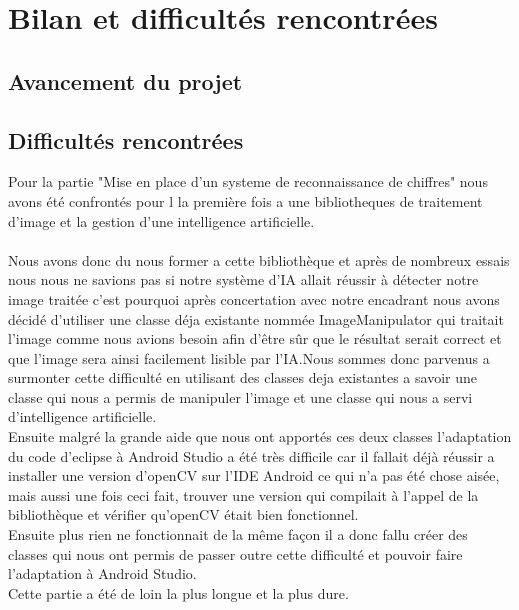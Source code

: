 \documentclass{article}
\begin{document}
\section{Bilan et difficultés rencontrées}

\subsection{Avancement du projet}





\subsection{Difficultés rencontrées}
Pour la partie "Mise en place d'un systeme de reconnaissance de chiffres" nous avons été confrontés pour l la première fois a une bibliotheques de traitement d'image et la gestion d'une intelligence artificielle.\\\\
Nous avons donc du nous former a cette bibliothèque et après de nombreux essais nous nous ne savions pas si notre système d'IA allait réussir à détecter notre image traitée c'est pourquoi après concertation avec notre encadrant nous avons décidé d'utiliser une classe déja existante nommée ImageManipulator qui traitait l'image comme nous avions besoin afin d'être sûr que le résultat serait correct et que l'image sera ainsi facilement lisible par l'IA.Nous sommes donc parvenus a surmonter cette difficulté en utilisant des classes deja existantes a savoir une classe qui nous a permis de manipuler l'image et une classe qui nous a servi d'intelligence artificielle.\\

Ensuite malgré la grande aide que nous ont apportés ces deux classes l'adaptation du code d'eclipse à Android Studio a été très difficile car il fallait déjà réussir a installer une version d'openCV sur l'IDE Android ce qui n'a pas été chose aisée, mais aussi une fois ceci fait, trouver une version qui compilait à l'appel de la bibliothèque et vérifier qu'openCV était bien fonctionnel.\\
Ensuite plus rien ne fonctionnait de la même façon il a donc fallu créer des classes qui nous ont permis de passer outre cette difficulté et pouvoir faire l'adaptation à Android Studio.\\

Cette partie a été de loin la plus longue et la plus dure.
\end{document}
